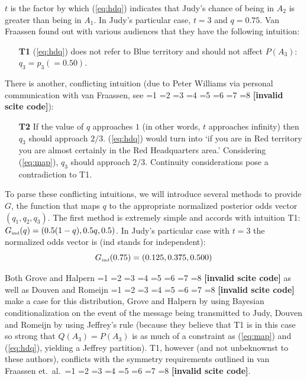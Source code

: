 \documentclass[12pt]{article}
\newcommand{\qnull}[1]{`#1'}
\newif\ifNumericalOrYear
\newcommand{\PageP}{p.~}
\newcommand{\PageP}{}
\newcommand{\scite}[3]{\ifnum#1=1\ifNumericalOrYear\citep{#2}\else\citeyearpar{#2}\fi\else
\ifnum#1=2\ifNumericalOrYear\citep[#3]{#2}\else\citep[{\PageP}#3]{#2}\fi\else
\ifnum#1=3\ifNumericalOrYear(\citet[#3]{#2})\else\citep[{\PageP}#3]{#2}\fi\else
\ifnum#1=4\ifNumericalOrYear\citet{#2}\else\citet{#2}\fi\else
\ifnum#1=5\ifNumericalOrYear(\citet{#2})\else\citep{#2}\fi\else
\ifnum#1=6\ifNumericalOrYear(\citet[#3]{#2})\else\citep[{\PageP}#3]{#2}\fi\else
\ifnum#1=7\ifNumericalOrYear\citep{#2}\else\citealp{#2}\fi\else
\ifnum#1=8\ifNumericalOrYear\citep[#3]{#2}\else\citealp[{\PageP}#3]{#2}\fi\else
\textbf{[invalid scite code]}\fi\fi\fi\fi\fi\fi\fi\fi}
\begin{document}
$t$ is the factor by which ({\ref{eq:hdq}}) indicates that Judy's
chance of being in $A_{2}$ is greater than being in $A_{1}$. In Judy's
particular case, $t=3$ and $q=0.75$. Van Fraassen found out with
various audiences that they have the following intuition:

\begin{enumerate}
  \item[\textbf{T1}] ({\ref{eq:hdq}}) does not refer to Blue territory and
  should not affect $P(A_{3})$: $q_{3}=p_{3}(=0.50)$.
\end{enumerate}

There is another, conflicting intuition (due to Peter Williams via
personal communication with van Fraassen, see
\scite{8}{fraassen81}{379}):

\begin{enumerate}
\item[\textbf{T2}] If the value of $q$ approaches $1$ (in other words,
  $t$ approaches infinity) then $q_{3}$ should approach $2/3$.
  ({\ref{eq:hdq}}) would turn into \qnull{if you are in Red territory
    you are almost certainly in the Red Headquarters area.}
  Considering ({\ref{eq:map}}), $q_{3}$ should approach $2/3$.
  Continuity considerations pose a contradiction to T1.
\end{enumerate}

To parse these conflicting intuitions, we will introduce several
methods to provide $G$, the function that maps $q$ to the appropriate
normalized posterior odds vector $(q_{1},q_{2},q_{3})$. The first
method is extremely simple and accords with intuition T1:
$G_{\mbox{{\tiny ind}}}(q)=(0.5(1-q),0.5q,0.5)$. In Judy's particular
case with $t=3$ the normalized odds vector is (ind stands for
independent):
\begin{displaymath}
  G_{\mbox{{\tiny ind}}}(0.75)=(0.125,0.375,0.500)
\end{displaymath}

Both Grove and Halpern \scite{1}{grovehalpern97}{} as well as Douven
and Romeijn \scite{1}{douvenromeijn09}{} make a case for this
distribution, Grove and Halpern by using Bayesian conditionalization
on the event of the message being transmitted to Judy, Douven and
Romeijn by using Jeffrey's rule (because they believe that T1 is in
this case so strong that $Q(A_{3})=P(A_{3})$ is as much of a
constraint as (\ref{eq:map}) and (\ref{eq:hdq}), yielding a Jeffrey
partition). T1, however (and not unbeknownst to these authors),
conflicts with the symmetry requirements outlined in van Fraassen et.\
al.\ \scite{1}{fraassenetal86}{}.
\end{document}
